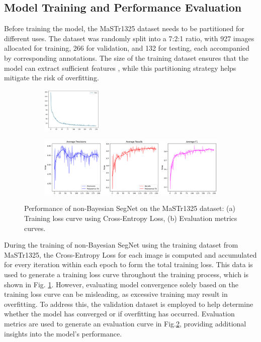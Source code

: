 \subsection{Model Training and Performance Evaluation}
\label{section:MTPE}
Before training the model, the MaSTr1325 dataset needs to be partitioned for different uses. The dataset was randomly 
split into a 7:2:1 ratio, with 927 images allocated for training, 266 for validation, and 132 for testing, each 
accompanied by corresponding annotations. The size of the training dataset ensures that the model can extract 
sufficient features \cite{MaSTr1325}, while this partitioning strategy helps mitigate the risk of overfitting. 
\begin{figure}[ht!]
    \centering
    \begin{subfigure}[b]{\textwidth}
        \centering
        \includegraphics[width=0.32\textwidth]{figures/MaSTr1325/trainloss-nonebayes.jpg}
        \caption{}
        \label{fig:nbs-mastr1325-tl}
    \end{subfigure}
    \centering
    \begin{subfigure}[b]{0.9\textwidth}
        \centering
        \includegraphics[width=\textwidth]{figures/MaSTr1325/validation-nonebayes.png}
        \caption{}
        \label{fig:nbs-mastr1325-val}
    \end{subfigure}
    \caption{Performance of non-Bayesian SegNet on the MaSTr1325 dataset: 
    (a) Training loss curve using Cross-Entropy Loss, (b) Evaluation metrics curves.}
    \label{fig:nbs-mastr1325-perf}
\end{figure}

During the training of non-Bayesian SegNet using the training dataset from MaSTr1325, the Cross-Entropy Loss for 
each image is computed and accumulated for every iteration within each epoch to form the total training loss. This 
data is used to generate a training loss curve throughout the training process, which is shown in Fig.
\ref{fig:nbs-mastr1325-tl}. However, evaluating model convergence solely based on the training loss curve can be 
misleading, as excessive training may result in overfitting. To address this, the validation dataset is employed 
to help determine whether the model has converged or if overfitting has occurred. Evaluation metrics are used to 
generate an evaluation curve in Fig.\ref{fig:nbs-mastr1325-val}, providing additional insights into the model's 
performance.

